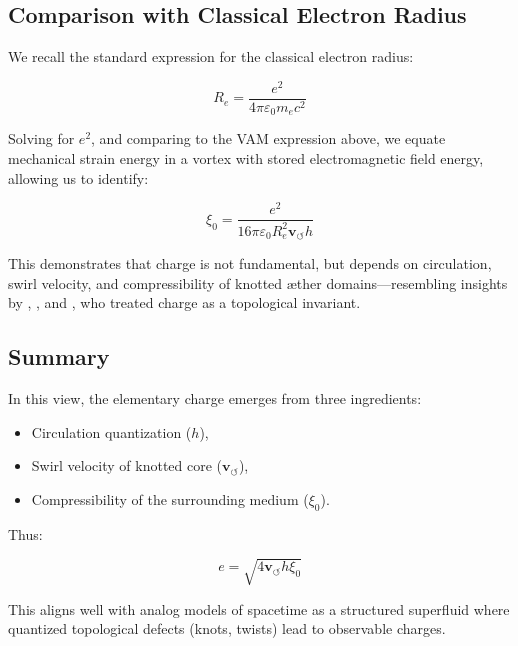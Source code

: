 \subsection*{Comparison with Classical Electron Radius}

We recall the standard expression for the classical electron radius:

\begin{equation}
    R_e = \frac{e^2}{4\pi \varepsilon_0 m_e c^2}
\end{equation}

Solving for \( e^2 \), and comparing to the VAM expression above, we equate mechanical strain energy in a vortex with stored electromagnetic field energy, allowing us to identify:

\begin{equation}
    \xi_0 = \frac{e^2}{16\pi \varepsilon_0 R_e^2 \mathbf{v}_{\scriptscriptstyle\boldsymbol{\circlearrowleft}} h}
\end{equation}

This demonstrates that charge is not fundamental, but depends on circulation, swirl velocity, and compressibility of knotted æther domains—resembling insights by \cite{ranada1989topological}, \cite{bowick1994charge}, and \cite{sidharth2006vortex}, who treated charge as a topological invariant.

\subsection*{Summary}

In this view, the elementary charge emerges from three ingredients:

\begin{itemize}
    \item Circulation quantization (\( h \)),
    \item Swirl velocity of knotted core (\( \mathbf{v}_{\scriptscriptstyle\boldsymbol{\circlearrowleft}} \)),
    \item Compressibility of the surrounding medium (\( \xi_0 \)).
\end{itemize}

Thus:

\begin{equation}
    \boxed{e = \sqrt{4 \mathbf{v}_{\scriptscriptstyle\boldsymbol{\circlearrowleft}} h \xi_0}}
\end{equation}

This aligns well with analog models of spacetime as a structured superfluid where quantized topological defects (knots, twists) lead to observable charges.